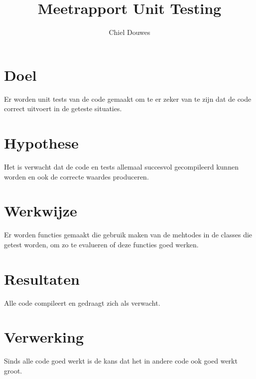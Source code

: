 \documentclass[11pt]{article}
\title{Meetrapport Unit Testing}
\author{Chiel Douwes}
\begin{document}
    \maketitle


    \section{Doel}\label{sec:doel}
    Er worden unit tests van de code gemaakt om te er zeker van te zijn dat de code correct
    uitvoert in de geteste situaties.


    \section{Hypothese}\label{sec:hypothese}
    Het is verwacht dat de code en tests allemaal succesvol gecompileerd kunnen worden en ook de
    correcte waardes produceren.


    \section{Werkwijze}\label{sec:werkwijze}
    Er worden functies gemaakt die gebruik maken van de mehtodes in de classes die getest worden,
    om zo te evalueren of deze functies goed werken.


    \section{Resultaten}\label{sec:resultaten}
    Alle code compileert en gedraagt zich als verwacht.


    \section{Verwerking}\label{sec:verwerking}
    Sinds alle code goed werkt is de kans dat het in andere code ook goed werkt groot.
\end{document}
